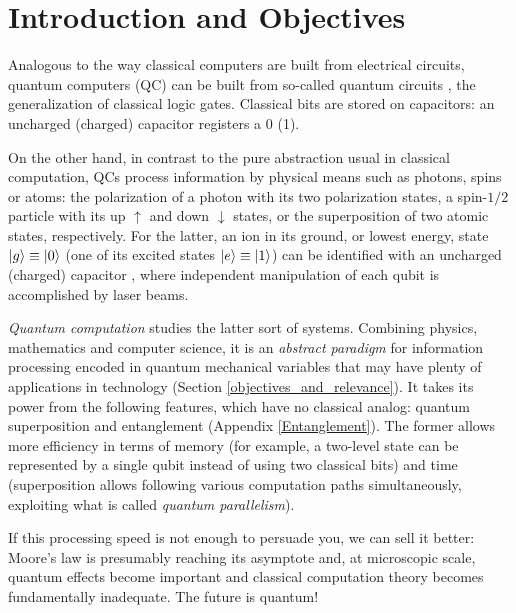 \documentclass[11pt]{article}
\numberwithin{equation}{section} %
\numberwithin{figure}{section} %
\begin{document}
\newpage

\hypersetup{linkcolor=black} %
\tableofcontents

\newpage

\hypersetup{linkcolor=red} %

\section{Introduction and Objectives} \label{Introduction}
Analogous to the way classical computers are built from electrical circuits, quantum computers (QC) can be built from so-called quantum circuits \cite[p.~17, l.~29]{Nielsen}, the generalization of classical logic gates. Classical bits are stored on capacitors: an uncharged (charged) capacitor registers a 0 (1). 

On the other hand, in contrast to the pure abstraction usual in classical computation, QCs process information by physical means such as  photons, spins or atoms: the polarization of a photon with its two polarization states,  a spin-$1/2$ particle with its up $\uparrow$ and down $\downarrow$ states, or the superposition of two atomic states, respectively. For the latter, an ion in its ground, or lowest energy, state $\ket{g}\equiv\ket{0}$ (one of its excited states $\ket{e}\equiv\ket{1}$)  can be identified with an uncharged (charged) capacitor \cite[p.~1073, l.~8-19]{Lloyd}, where independent manipulation of each qubit is accomplished by laser beams. 

\emph{Quantum computation} studies the latter sort of systems. Combining physics, mathematics and computer science, it is an \emph{abstract paradigm} for information processing encoded in quantum mechanical variables that may have plenty of applications in technology (Section \ref{objectives_and_relevance}). It takes its power from the following features, which have no classical analog: quantum superposition and entanglement (Appendix \ref{Entanglement}). The former allows more efficiency in terms of memory (for example, a two-level state can be represented by a single qubit instead of using two classical bits) and time (superposition allows following various computation paths simultaneously, exploiting what is called \emph{quantum parallelism}). 

If this processing speed is not enough to persuade you, we can sell it better: Moore's law is presumably reaching its asymptote and, at microscopic scale, quantum effects become important and classical computation theory becomes fundamentally inadequate. The future is quantum!
 
\end{document}
